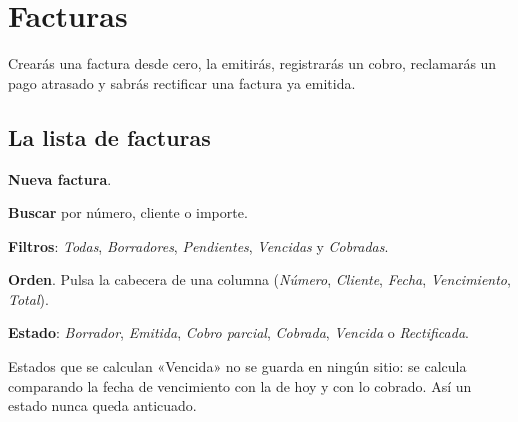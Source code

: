 \chapter{Facturas}\label{cap:facturas}

\begin{objbox}
Crearás una factura desde cero, la emitirás, registrarás un cobro, reclamarás un pago atrasado y sabrás rectificar una factura ya emitida.
\end{objbox}

\section{La lista de facturas}
\begin{leyenda}
\item[\mk{1}] \textbf{Nueva factura}.
\item[\mk{2}] \textbf{Buscar} por número, cliente o importe.
\item[\mk{3}] \textbf{Filtros}: \emph{Todas}, \emph{Borradores}, \emph{Pendientes}, \emph{Vencidas} y \emph{Cobradas}.
\item[\mk{4}] \textbf{Orden}. Pulsa la cabecera de una columna (\emph{Número}, \emph{Cliente}, \emph{Fecha}, \emph{Vencimiento}, \emph{Total}).
\item[\mk{5}] \textbf{Estado}: \emph{Borrador}, \emph{Emitida}, \emph{Cobro parcial}, \emph{Cobrada}, \emph{Vencida} o \emph{Rectificada}.
\end{leyenda}

\begin{plainbox}{Estados que se calculan}
«Vencida» no se guarda en ningún sitio: se calcula comparando la fecha de vencimiento con la de hoy y con lo cobrado. Así un estado nunca queda anticuado.
\end{plainbox}

